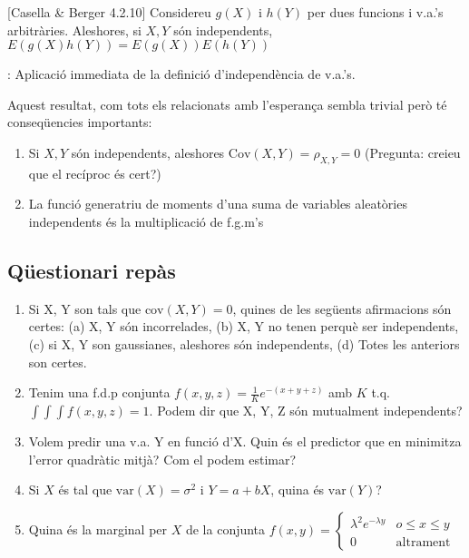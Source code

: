 \documentclass[letterpaper,10pt,english]{sphinxmanual}
\begin{document}
{[}Casella \& Berger 4.2.10{]} Considereu \(g(X)\) i \(h(Y)\) per dues funcions
i v.a.’s arbitràries. Aleshores, si \(X, Y\) són independents, \(E(g(X)h(Y)) = E(g(X))E(h(Y))\)

: Aplicació immediata de la definició d’independència de v.a.’s.

Aquest resultat, com tots els relacionats amb l’esperança sembla trivial però
té conseqüencies importants:
\begin{enumerate}
%
\item {} 
Si \(X, Y\) són independents, aleshores \(\mbox{Cov}(X,Y)=\rho_{X,Y} = 0\) (Pregunta: creieu que el recíproc és cert?)

\item {} 
La funció generatriu de moments d’una suma de variables aleatòries independents és la multiplicació de f.g.m’s

\end{enumerate}


\subsection{Qüestionari repàs}
\label{\detokenize{0_Intro/0_1_Repas_probabilitat:questionari-repas}}\begin{enumerate}
%
\item {} 
Si X, Y son tals que \(\mbox{cov}(X, Y) = 0\), quines de les següents afirmacions són certes: (a) X, Y són incorrelades, (b) X, Y no tenen perquè ser independents, (c) si X, Y son gaussianes, aleshores són independents, (d) Totes les anteriors son certes.

\item {} 
Tenim una f.d.p conjunta \(f(x,y,z) = \frac{1}{K} e^{- (x + y + z)}\) amb \(K\) t.q. \(\int \int \int f(x,y,z) = 1\). Podem dir que X, Y, Z són mutualment independents?

\item {} 
Volem predir una v.a. Y en funció d’X. Quin és el predictor que en minimitza l’error quadràtic mitjà? Com el podem estimar?

\item {} 
Si \(X\) és tal que \(\mbox{var}(X)=\sigma^2\) i \(Y = a + b X\), quina és \(\mbox{var}(Y)\)?

\item {} 
Quina és la marginal per \(X\) de la conjunta \(f(x,y)=\left\{\begin{array}{cc}\lambda^2 e^{- \lambda y} & o \leq x \leq y \\ 0 & \mbox{altrament} \end{array}\right.\)

\end{enumerate}
\end{document}
